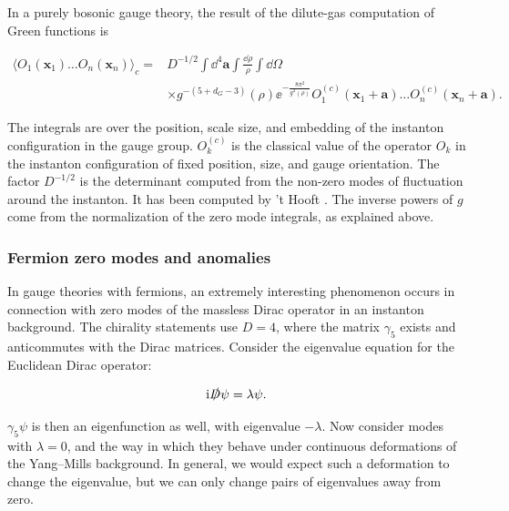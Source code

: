 In a purely bosonic gauge theory, the result of the dilute-gas computation of
Green functions is

\begin{equation}
\begin{aligned}
  \langle O_1(\mathbf x_1)\ldots O_n(\mathbf x_n)\rangle_c
  ={}&D^{-1/2}\int\dd^4\mathbf a\int\frac{\dd\rho}{\rho}\int\dd\Omega\\
  &\times g^{-(5+d_G-3)}(\rho)\ee^{-\frac{8\pi^2}{g^2(\rho)}}
  O_1^{(c)}(\mathbf x_1+\mathbf a)\ldots
  O_n^{(c)}(\mathbf x_n+\mathbf a).
  \label{eq:10.18}
\end{aligned}
\end{equation}

The integrals are over the position, scale size, and embedding of the instanton
configuration in the gauge group. $O_k^{(c)}$ is the classical value of the
operator $O_k$ in the instanton configuration of fixed position, size, and gauge
orientation. The factor $D^{-1/2}$ is the determinant computed from the
non-zero modes of fluctuation around the instanton. It has been computed by 't
Hooft \cite{banks-ref-142}. The inverse powers of $g$ come from the normalization
of the zero mode integrals, as explained above.

\subsubsection{Fermion zero modes and anomalies}

In gauge theories with fermions, an extremely interesting phenomenon occurs in
connection with zero modes of the massless Dirac operator in an instanton
background. The chirality statements use $D=4$, where the matrix $\gamma_5$
exists and anticommutes with the Dirac matrices. Consider the eigenvalue
equation for the Euclidean Dirac operator:

\begin{equation}
  \mathrm{i}\slashed D\psi=\lambda\psi.
  \label{eq:10.19}
\end{equation}

$\gamma_5\psi$ is then an eigenfunction as well, with eigenvalue $-\lambda$.
Now consider modes with $\lambda=0$, and the way in which they behave under
continuous deformations of the Yang--Mills background. In general, we would
expect such a deformation to change the eigenvalue, but we can only change pairs
of eigenvalues away from zero.

